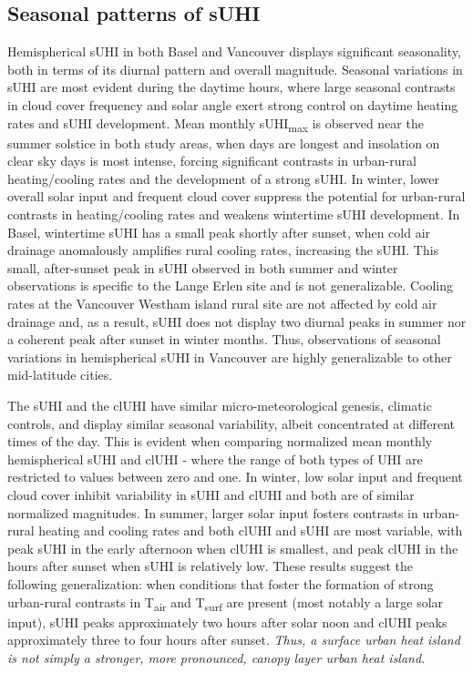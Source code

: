 \begin{bibunit}
\subsection{Seasonal patterns of sUHI}

Hemispherical sUHI in both Basel and Vancouver displays significant seasonality, both in terms of its diurnal pattern and overall magnitude. Seasonal variations in sUHI are most evident during the daytime hours, where large seasonal contrasts in cloud cover frequency and solar angle exert strong control on daytime heating rates and sUHI development. Mean monthly sUHI\textsubscript{max} is observed near the summer solstice in both study areas, when days are longest and insolation on clear sky days is most intense, forcing significant contrasts in urban-rural heating/cooling rates and the development of a strong sUHI. In winter, lower overall solar input and frequent cloud cover suppress the potential for urban-rural contrasts in heating/cooling rates and weakens wintertime sUHI development. In Basel, wintertime sUHI has a small peak shortly after sunset, when cold air drainage anomalously amplifies rural cooling rates, increasing the sUHI. This small, after-sunset peak in sUHI observed in both summer and winter observations is specific to the Lange Erlen site and is not generalizable. Cooling rates at the Vancouver Westham island rural site are not affected by cold air drainage and, as a result, sUHI does not display two diurnal peaks in summer nor a coherent peak after sunset in winter months. Thus, observations of seasonal variations in hemispherical sUHI in Vancouver are highly generalizable to other mid-latitude cities.

The sUHI and the clUHI have similar micro-meteorological genesis, climatic controls, and display similar seasonal variability, albeit concentrated at different times of the day. This is evident when comparing normalized mean monthly hemispherical sUHI and clUHI - where the range of both types of UHI are restricted to values between zero and one. In winter, low solar input and frequent cloud cover inhibit variability in sUHI and clUHI and both are of similar normalized magnitudes. In summer, larger solar input fosters contrasts in urban-rural heating and cooling rates and both clUHI and sUHI are most variable, with peak sUHI in the early afternoon when clUHI is smallest, and peak clUHI in the hours after sunset when sUHI is relatively low. These results suggest the following generalization: when conditions that foster the formation of strong urban-rural contrasts in T\textsubscript{air} and T\textsubscript{surf} are present (most notably a large solar input), sUHI peaks approximately two hours after solar noon and clUHI peaks approximately three to four hours after sunset. \textit{Thus, a surface urban heat island is not simply a stronger, more pronounced, canopy layer urban heat island. }


\end{bibunit}
